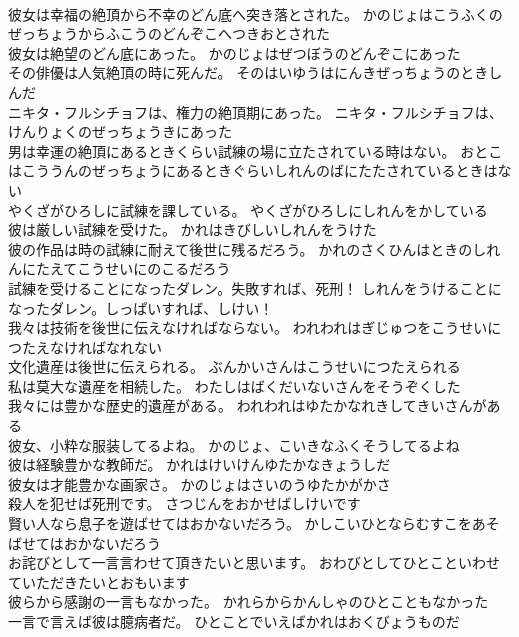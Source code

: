 \documentclass[8pt]{extreport}
\begin{document}
\begin{CJK}{UTF8}{min}
\\	彼女は幸福の絶頂から不幸のどん底へ突き落とされた。	かのじょはこうふくのぜっちょうからふこうのどんぞこへつきおとされた 
\\	彼女は絶望のどん底にあった。	かのじょはぜつぼうのどんぞこにあった 
\\	その俳優は人気絶頂の時に死んだ。	そのはいゆうはにんきぜっちょうのときしんだ 
\\	ニキタ・フルシチョフは、権力の絶頂期にあった。	ニキタ・フルシチョフは、けんりょくのぜっちょうきにあった 
\\	男は幸運の絶頂にあるときくらい試練の場に立たされている時はない。	おとこはこううんのぜっちょうにあるときぐらいしれんのばにたたされているときはない 
\\	やくざがひろしに試練を課している。	やくざがひろしにしれんをかしている 
\\	彼は厳しい試練を受けた。	かれはきびしいしれんをうけた 
\\	彼の作品は時の試練に耐えて後世に残るだろう。	かれのさくひんはときのしれんにたえてこうせいにのこるだろう 
\\	試練を受けることになったダレン。失敗すれば、死刑！	しれんをうけることになったダレン。しっぱいすれば、しけい！ 
\\	我々は技術を後世に伝えなければならない。	われわれはぎじゅつをこうせいにつたえなければなれない 
\\	文化遺産は後世に伝えられる。	ぶんかいさんはこうせいにつたえられる 
\\	私は莫大な遺産を相続した。	わたしはばくだいないさんをそうぞくした 
\\	我々には豊かな歴史的遺産がある。	われわれはゆたかなれきしてきいさんがある 
\\	彼女、小粋な服装してるよね。	かのじょ、こいきなふくそうしてるよね 
\\	彼は経験豊かな教師だ。	かれはけいけんゆたかなきょうしだ 
\\	彼女は才能豊かな画家さ。	かのじょはさいのうゆたかがかさ 
\\	殺人を犯せば死刑です。	さつじんをおかせばしけいです 
\\	賢い人なら息子を遊ばせてはおかないだろう。	かしこいひとならむすこをあそばせてはおかないだろう 
\\	お詫びとして一言言わせて頂きたいと思います。	おわびとしてひとこといわせていただきたいとおもいます 
\\	彼らから感謝の一言もなかった。	かれらからかんしゃのひとこともなかった 
\\	一言で言えば彼は臆病者だ。	ひとことでいえばかれはおくびょうものだ 

\end{CJK}
\end{document}
